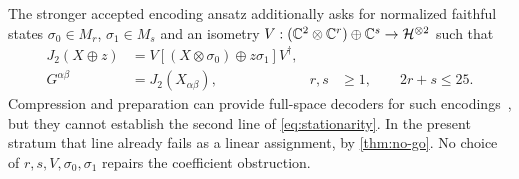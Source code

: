 The stronger accepted encoding ansatz additionally asks for
normalized faithful states $\sigma_0\in M_r$, $\sigma_1\in M_s$
and an isometry
$V:(\mathbb{C}^2\otimes\mathbb{C}^r)\oplus\mathbb{C}^s\to\mathcal{H}^{\otimes2}$ such that
\begin{align}
	J_2(X\oplus z)
	    & =V[(X\otimes\sigma_0)\oplus z\sigma_1]V^\dagger,
	\nonumber                                              \\
	G^{\alpha\beta}
	    & =J_2(X_{\alpha\beta}),
	    &
	r,s & \geq1,\qquad 2r+s\leq25.
	\label{eq:stationarity}
\end{align}
Compression and preparation can provide full-space decoders for
such encodings~\cite{Kato}, but they cannot establish the second
line of \cref{eq:stationarity}. In the present stratum that line
already fails as a linear assignment, by \cref{thm:no-go}.
No choice of $r,s,V,\sigma_0,\sigma_1$ repairs the coefficient
obstruction.
